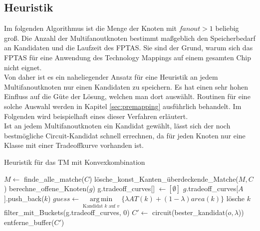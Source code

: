 \documentclass[11pt, a4paper, german]{article}
\DeclareMathOperator*{\argmin}{arg\,min}
\begin{document}
\subsection{Heuristik}
\label{subsec:heuristik}
Im folgenden Algorithmus ist die Menge der Knoten mit $fanout > 1$ beliebig groß.
Die Anzahl der Multifanoutknoten bestimmt maßgeblich den Speicherbedarf an Kandidaten und die Laufzeit des FPTAS. Sie sind der Grund, warum sich das FPTAS für eine Anwendung des Technology Mappings auf einem gesamten Chip nicht eignet. \\
Von daher ist es ein naheliegender Ansatz für eine Heuristik an jedem Multifanoutknoten nur einen Kandidaten zu speichern. Es hat einen sehr hohen Einfluss auf die Güte der Lösung, welchen man dort auswählt. Routinen für eine solche Auswahl werden in Kapitel \ref{sec:premapping} ausführlich behandelt. Im Folgenden wird beispielhaft eines dieser Verfahren erläutert. \\
Ist an jedem Multifanoutknoten ein Kandidat gewählt, lässt sich der noch bestmögliche Circuit-Kandidat schnell errechnen, da für jeden Knoten nur eine Klasse mit einer Tradeoffkurve vorhanden ist.\\

\LinesNumbered
\begin{algorithm}[H]
\DontPrintSemicolon
\caption{Heuristik f\"ur das TM mit Konvexkombination}

   $M \gets$ finde\_alle\_matche($C$)\;
   lösche\_konst\_Kanten\_überdeckende\_Matche($M, C$)\;
        {
			berechne\_offene\_Knoten($g$)\;	 
        }
  {
    g.tradeoff\_curves[] $\gets [\emptyset]$\;
    {
      {
        {
        	 {
			$g$.tradeoff\_curves[$A$].push\_back($k$)\;      	 
        	 }  
        }
      }
    }
  {
    $guess \gets \argmin\limits_{\text{Kandidat }k\text{ auf }v}\{ \lambda AT(k) + (1-\lambda) area(k)  \}$\;
    {
      {
	l\"osche $k$\;
      }
    }
  }    
    filter\_mit\_Buckets(g.tradeoff\_curves, 0)\;    
  }
  $C' \gets $ circuit(bester\_kandidat($o, \lambda$))\;
  \Return entferne\_buffer($C'$)\;
\end{algorithm}\ \\
\end{document}
